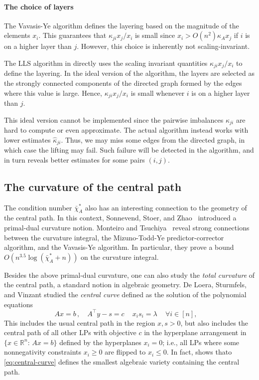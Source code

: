 \documentclass[11pt, a4paper]{article}
\newcommand{\1}{\mathbbm{1}}
\theoremstyle{case}
\newcommand{\R}{\mathbb{R}}
\begin{document}
\paragraph{The choice of layers}
The Vavasis-Ye algorithm defines the layering based on the magnitude of the elements $x_i$. This guarantees that  $\kappa_{ji}{x_j}/{x_i}$ is small since 
$x_i>O(n^2)\kappa_A x_{j}$ if $i$ is on a higher layer than $j$. However, this choice is inherently not scaling-invariant.

The LLS algorithm in \cite{DHNV20} directly uses the scaling invariant quantities $\kappa_{ji}{x_j}/{x_i}$ to define the layering. In the ideal version of the algorithm, the layers are selected as the strongly connected components of the directed graph formed by the edges where this value is large. Hence, $\kappa_{ji}{x_j}/{x_i}$ is small whenever $i$ is on a higher layer than $j$.

This ideal version cannot be implemented since the pairwise imbalances $\kappa_{ji}$ are hard to compute or even approximate. The actual algorithm instead works with lower estimates $\hat\kappa_{ji}$. Thus, we may miss some edges from the directed graph, in which case the lifting may fail. Such failure will be detected in the algorithm, and in turn reveals better estimates for some pairs $(i,j)$.

\subsection{The curvature of the central path}
The condition number $\bar\chi_A^*$ also has an interesting connection to the geometry of the central path. In this context, Sonnevend, Stoer, and Zhao~\cite{Sonnevend1991} introduced a primal-dual curvature notion. 
Monteiro and
Tsuchiya~\cite{Monteiro2008} reveal strong connections between the curvature integral, the Mizuno-Todd-Ye predictor-corrector algorithm, and the Vavasis-Ye algorithm. In particular, they prove a bound 
$O(n^{3.5} \log(\bar{\chi}^*_A+n))$ on the curvature integral.

Besides the above primal-dual curvature, one can also study the \emph{total curvature} of the central path, a standard notion in algebraic geometry. De Loera, Sturmfels, and Vinzant \cite{Loera2012} studied the \emph{central curve} defined as the solution of the polynomial equations
\begin{equation}\label{eq:central-curve}
Ax=b\, ,\quad A^\top y-s=c\, \quad x_i s_i=\lambda\, \quad \forall i\in[n],\quad 
\end{equation}
This includes the usual central path in the region $x,s>0$, but also includes the central path of all other LPs with objective $c$ in the hyperplane arrangement in $\{x\in\R^n:\, Ax=b\}$ defined by the hyperplanes $x_i=0$; i.e., all LPs where some nonnegativity constraints $x_i\ge 0$ are flipped to $x_i\le 0$.
 In fact, \cite{Loera2012} shows thato \eqref{eq:central-curve} defines the smallest algebraic variety containing the central path.
 
\end{document}
